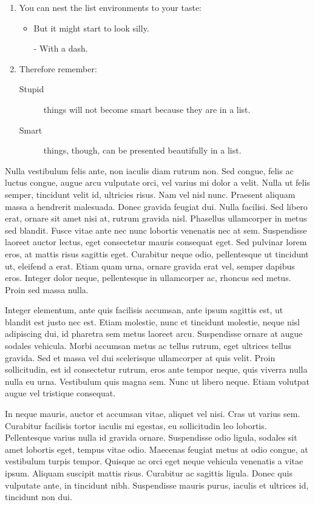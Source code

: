 \begin{flushleft}
  \begin{enumerate}
  \item You can nest the list
    environments to your taste:
    \begin{itemize}
    \item But it might start to
      look silly.
    \item[-] With a dash.
    \end{itemize}
  \item Therefore remember:
    \begin{description}
    \item[Stupid] things will not
      become smart because they are
      in a list.
    \item[Smart] things, though,
      can be presented beautifully
      in a list.
    \end{description}
  \end{enumerate}
\end{flushleft}

Nulla vestibulum felis ante, non iaculis diam rutrum non. Sed congue, felis ac luctus congue, augue arcu vulputate orci, vel varius mi dolor a velit. Nulla ut felis semper, tincidunt velit id, ultricies risus. Nam vel nisl nunc. Praesent aliquam massa a hendrerit malesuada. Donec gravida feugiat dui. Nulla facilisi. Sed libero erat, ornare sit amet nisi at, rutrum gravida nisl. Phasellus ullamcorper in metus sed blandit. Fusce vitae ante nec nunc lobortis venenatis nec at sem. Suspendisse laoreet auctor lectus, eget consectetur mauris consequat eget. Sed pulvinar lorem eros, at mattis risus sagittis eget. Curabitur neque odio, pellentesque ut tincidunt ut, eleifend a erat. Etiam quam urna, ornare gravida erat vel, semper dapibus eros. Integer dolor neque, pellentesque in ullamcorper ac, rhoncus sed metus. Proin sed massa nulla.

Integer elementum, ante quis facilisis accumsan, ante ipsum sagittis est, ut blandit est justo nec est. Etiam molestie, nunc et tincidunt molestie, neque nisl adipiscing dui, id pharetra sem metus laoreet arcu. Suspendisse ornare at augue sodales vehicula. Morbi accumsan metus ac tellus rutrum, eget ultrices tellus gravida. Sed et massa vel dui scelerisque ullamcorper at quis velit. Proin sollicitudin, est id consectetur rutrum, eros ante tempor neque, quis viverra nulla nulla eu urna. Vestibulum quis magna sem. Nunc ut libero neque. Etiam volutpat augue vel tristique consequat.

In neque mauris, auctor et accumsan vitae, aliquet vel nisi. Cras ut varius sem. Curabitur facilisis tortor iaculis mi egestas, eu sollicitudin leo lobortis. Pellentesque varius nulla id gravida ornare. Suspendisse odio ligula, sodales sit amet lobortis eget, tempus vitae odio. Maecenas feugiat metus at odio congue, at vestibulum turpis tempor. Quisque ac orci eget neque vehicula venenatis a vitae ipsum. Aliquam suscipit mattis risus. Curabitur ac sagittis ligula. Donec quis vulputate ante, in tincidunt nibh. Suspendisse mauris purus, iaculis et ultrices id, tincidunt non dui.